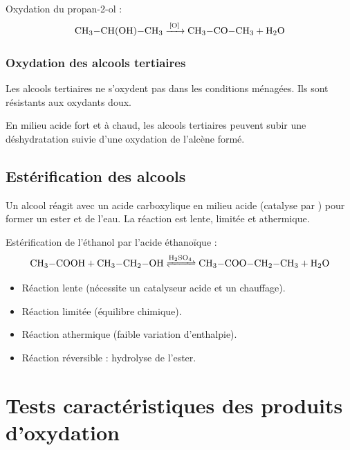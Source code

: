 \begin{exemple}
Oxydation du propan-2-ol :
\[\ce{CH3-CH(OH)-CH3 ->[{[O]}] CH3-CO-CH3 + H2O}\]
\end{exemple}

\subsubsection{Oxydation des alcools tertiaires}

\begin{propriete}
Les alcools tertiaires ne s'oxydent pas dans les conditions ménagées. Ils sont résistants aux oxydants doux.
\end{propriete}

\begin{remarque}
En milieu acide fort et à chaud, les alcools tertiaires peuvent subir une déshydratation suivie d'une oxydation de l'alcène formé.
\end{remarque}

\subsection{Estérification des alcools}

\begin{experience}[Estérification]
Un alcool réagit avec un acide carboxylique en milieu acide (catalyse par ) pour former un ester et de l'eau. La réaction est lente, limitée et athermique.
\end{experience}

\begin{exemple}
Estérification de l'éthanol par l'acide éthanoïque :
\[\ce{CH3-COOH + CH3-CH2-OH <=>[H2SO4] CH3-COO-CH2-CH3 + H2O}\]
\end{exemple}

\begin{propriete}
\begin{itemize}
\item Réaction lente (nécessite un catalyseur acide et un chauffage).
\item Réaction limitée (équilibre chimique).
\item Réaction athermique (faible variation d'enthalpie).
\item Réaction réversible : hydrolyse de l'ester.
\end{itemize}
\end{propriete}

\section{Tests caractéristiques des produits d'oxydation}

